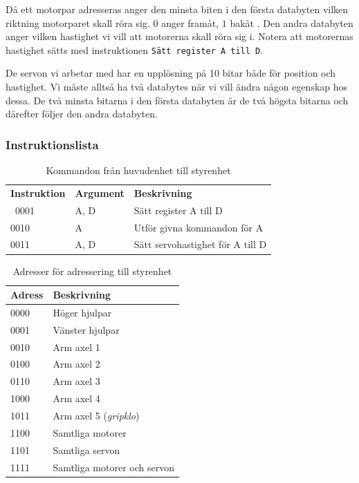 Då ett motorpar adresseras anger den minsta biten i den första databyten vilken riktning motorparet skall röra sig. $0$ anger framåt, $1$ bakåt . Den andra databyten anger vilken hastighet vi vill att motorerna skall röra sig i. Notera att motorernas hastighet sätts med instruktionen \texttt{Sätt register A till D}.

De servon vi arbetar med har en upplösning på 10 bitar både för position och hastighet. Vi måste alltså ha två databytes när vi vill ändra någon egenskap hos dessa. De två minsta bitarna i den första databyten är de två högsta bitarna och därefter följer den andra databyten.


\subsubsection{Instruktionslista}

\begin{table}[h!]
	\centering
	\begin{tabularx}{\textwidth}{| l | l | X |}
		\hline
		\textbf{Instruktion} & \textbf{Argument} & \textbf{Beskrivning} \\\
		{0001} & {A, D} & {Sätt register A till D} \\\hline
		{0010} & {A} & {Utför givna kommandon för A} \\\hline
		{0011} & {A, D} & {Sätt servohastighet för A till D} \\\hline
	\end{tabularx}
	\caption{Kommandon från huvudenhet till styrenhet} \label{protokoll:pc-motor-tabell}
\end{table}

\begin{table}[h!]
	\centering
	\begin{tabularx}{\textwidth}{| l | X |}
		\hline
		\textbf{Adress} & \textbf{Beskrivning} \\\hline
		{0000} & {Höger hjulpar} \\\hline
		{0001} & {Vänster hjulpar} \\\hline
		{0010} & {Arm axel 1} \\\hline
		{0100} & {Arm axel 2} \\\hline
		{0110} & {Arm axel 3} \\\hline
		{1000} & {Arm axel 4} \\\hline
		{1011} & {Arm axel 5 (\textit{gripklo})} \\\hline
		{1100} & {Samtliga motorer} \\\hline
		{1101} & {Samtliga servon} \\\hline
		{1111} & {Samtliga motorer och servon} \\\hline
	\end{tabularx}
	\caption{Adresser för adressering till styrenhet} \label{protokoll:pc-motor-adress-tabell}
\end{table}

